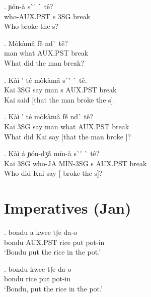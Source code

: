 \documentclass{assets/fieldnotes}
\begin{document}
{\exg. ɲ\'{o}n-\`{a} s\`{}\'{} \`{} t\^{e}? \\
who-AUX.PST s 3SG break \\
Who broke the s? 

\exg. M\`{o}k\`{a}m\^{a} fẽ̌  nd\`{} t\^{e}? \\
man what AUX.PST break \\ 
What did the man break? 


\exg. K\`{a}\`{i} \'{} t\'{e} m\`{o}k\`{a}m\^{a} s\`{}\'{} \`{} t\^{e}. \\ 
Kai 3SG say man s AUX.PST break \\
Kai said [that the man broke the s]. 

\exg. K\`{a}\`{i} \'{} t\'{e} m\`{o}k\`{a}m\^{a} fẽ̌  nd\`{}  t\^{e}? \\ 
Kai 3SG say man what AUX.PST break \\
What did Kai say [that the man broke ]? 

\exg. K\`{a}\`{i} \'{a} ɲ\'{o}n-dʒã̀ m\'{i}n-\`{a} s\`{}\'{} \`{}  t\^{e}? \\
Kai 3SG who-JA MIN-3SG s AUX.PST break \\
Who did Kai say [ broke the s]? 


\section{Imperatives (Jan)} 


\exg. bondu a kwee tʃe da-o \\
bondu AUX.PST rice put pot-in \\
`Bondu put the rice in the pot.'

\exg. bondu kwee tʃe da-o \\
bondu rice put pot-in \\
`Bondu, put the rice in the pot.'

}
\end{document}
